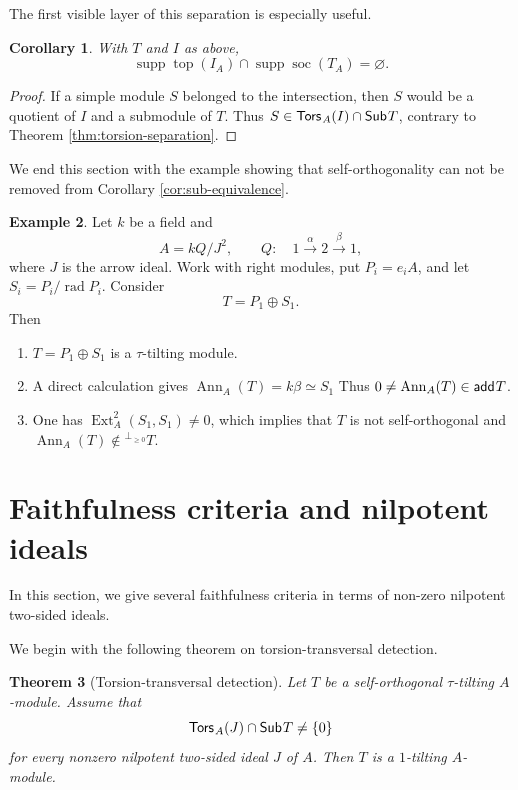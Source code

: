 \documentclass[a4paper,reqno]{amsart}
\newtheorem{theorem}{Theorem}[section]
\newtheorem{corollary}[theorem]{Corollary}
\theoremstyle{definition}
\newtheorem{example}[theorem]{Example}
\newcommand{\Ext}{\operatorname{Ext}\nolimits}
\newcommand{\Ann}{\operatorname{Ann}\nolimits}
\newcommand{\rad}{\operatorname{rad}\nolimits}
\newcommand{\soc}{\operatorname{soc}\nolimits}
\newcommand{\topm}{\operatorname{top}\nolimits}
\newcommand{\supp}{\operatorname{supp}\nolimits}
\newcommand{\add}{\mathsf{add}\hspace{.01in}}
\newcommand{\Sub}{\mathsf{Sub}\hspace{.01in}}
\newcommand{\Tors}{\mathsf{Tors}\hspace{.01in}}
\newcommand{\perpall}[1]{{}^{\perp_{\geq 0}}#1}
\numberwithin{equation}{section}
\begin{document}
The first visible layer of this separation is especially useful.

\begin{corollary}\label{cor:top-socle}
With $T$ and $I$ as above,
\[
              \supp\topm(I_A)\cap\supp\soc(T_A)=\varnothing.
\]
\end{corollary}

\begin{proof}
If a simple module $S$ belonged to the intersection, then $S$ would
be a quotient of $I$ and a submodule of $T$. Thus
$S\in\Tors_A(I)\cap\Sub T$, contrary to Theorem
\ref{thm:torsion-separation}.
\end{proof}

We end this section with the example showing that self-orthogonality can not be removed
from Corollary \ref{cor:sub-equivalence}.

\begin{example}
\label{ex:selforth-essential}
Let $k$ be a field and
\[
 A=kQ/J^2,
 \qquad
 Q:\quad 1\xrightarrow{\alpha}2\xrightarrow{\beta}1,
\]
where $J$ is the arrow ideal. Work with right modules, put
$P_i=e_iA$, and let $S_i=P_i/\rad P_i$.  Consider
\[
                         T=P_1\oplus S_1. 
\]
Then
\begin{enumerate}

\item  $T=P_1\oplus S_1$ is a $\tau$-tilting module.

\item A direct calculation gives $\Ann_A(T)=k\beta\simeq S_1$
Thus $0\neq\Ann_A(T)\in\add T$.  

\item One has $\Ext_A^2(S_1,S_1)\neq0$, which implies that $T$ is not self-orthogonal and $\Ann_A(T)\not\in \perpall{T}$.

\end{enumerate}
\end{example}




\section{Faithfulness criteria and nilpotent ideals}

In this section, we give several faithfulness criteria in terms of non-zero nilpotent two-sided ideals.

We begin with the following theorem on torsion-transversal detection.

\begin{theorem}[Torsion-transversal detection]
\label{thm:torsion-transversal}
Let $T$ be a self-orthogonal $\tau$-tilting $A$-module. Assume that
\begin{equation}\label{eq:torsion-transversal}
       \Tors_A(J)\cap\Sub T\neq\{0\}
\end{equation}
for every nonzero nilpotent two-sided ideal $J$ of $A$. Then $T$ is
a $1$-tilting $A$-module.
\end{theorem}
\end{document}
